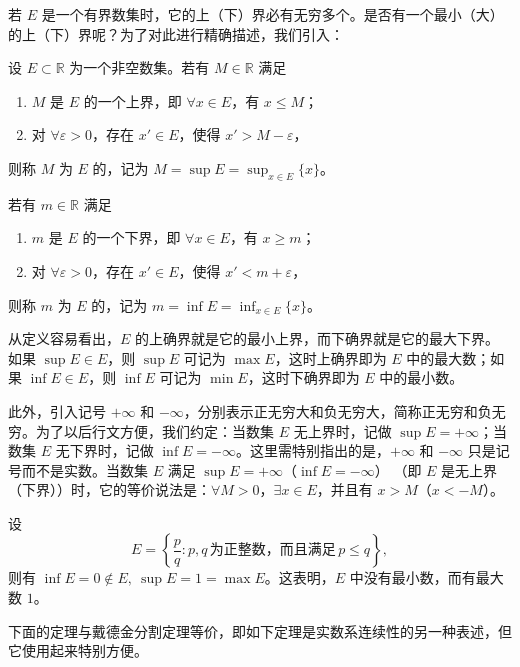 \documentclass[UTF8,12pt,a4paper,fontset=fandol]{ctexbook}
\begin{document}
若 $E$ 是一个有界数集时，它的上（下）界必有无穷多个。是否有一个最小（大）的上（下）界呢？为了对此进行精确描述，我们引入：


\begin{definition}
设 $E\subset\mathbb{R}$ 为一个非空数集。若有 $M\in\mathbb{R}$ 满足
\begin{enumerate}[label=(\arabic*)]
  \item $M$ 是 $E$ 的一个上界，即 $\forall x\in E$，有 $x\leqslant M$；
  \item 对 $\forall\varepsilon>0$，存在 $x'\in E$，使得 $x'>M-\varepsilon$，
\end{enumerate}
则称 $M$ 为 $E$ 的，记为 $M=\sup E=\sup_{x\in E}\{x\}$。


若有 $m\in\mathbb{R}$ 满足
\begin{enumerate}[label=(\arabic*)]
  \item $m$ 是 $E$ 的一个下界，即 $\forall x\in E$，有 $x\geqslant m$；
  \item 对 $\forall\varepsilon>0$，存在 $x'\in E$，使得 $x'<m+\varepsilon$，
\end{enumerate}
则称 $m$ 为 $E$ 的，记为 $m=\inf E=\inf_{x\in E}\{x\}$。
\end{definition}


从定义容易看出，$E$ 的上确界就是它的最小上界，而下确界就是它的最大下界。如果 $\sup E\in E$，则 $\sup E$ 可记为 $\max E$，这时上确界即为 $E$ 中的最大数；如果 $\inf E\in E$，则 $\inf E$ 可记为 $\min E$，这时下确界即为 $E$ 中的最小数。


此外，引入记号 $+\infty$ 和 $-\infty$，分别表示正无穷大和负无穷大，简称正无穷和负无穷。为了以后行文方便，我们约定：当数集 $E$ 无上界时，记做 $\sup E=+\infty$；当数集 $E$ 无下界时，记做 $\inf E=-\infty$。这里需特别指出的是，$+\infty$ 和 $-\infty$ 只是记号而不是实数。当数集 $E$ 满足 $\sup E=+\infty$（$\inf E=-\infty$） （即 $E$ 是无上界（下界））时，它的等价说法是：$\forall M>0$，$\exists x\in E$，并且有 $x>M$（$x<-M$）。


\begin{example}
设
\[
  E=\left\{\frac pq:p,q\,\text{为正整数，而且满足}\,p\leqslant q\right\},
\]
则有 $\inf E=0\notin E,\ \sup E=1=\max E$。这表明，$E$ 中没有最小数，而有最大数 $1$。
\end{example}


下面的定理与戴德金分割定理等价，即如下定理是实数系连续性的另一种表述，但它使用起来特别方便。
\end{document}
